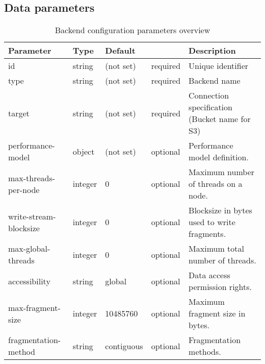 

\subsection{Data parameters}

\begin{preserve}
\begin{table}[!h]
  \begin{center}
      \begin{tabularx}{\textwidth}{llllX}
        Parameter              & Type    & Default    &          & Description \\
        \hline
        id                     & string  & (not set)  & required & Unique identifier \\
        type                   & string  & (not set)  & required & Backend name \\
        target                 & string  & (not set)  & required & Connection specification (Bucket name for S3) \\
        performance-model      & object  & (not set)  & optional & Performance model definition.\\
        max-threads-per-node   & integer & 0          & optional & Maximum number of threads on a node. \\
        write-stream-blocksize & integer & 0          & optional & Blocksize in bytes used to write fragments. \\
        max-global-threads     & integer & 0          & optional & Maximum total number of threads. \\
        accessibility          & string  & global     & optional & Data access permission rights. \\
        max-fragment-size      & integer & 10485760   & optional & Maximum fragment size in bytes. \\
        fragmentation-method   & string  & contiguous & optional & Fragmentation methods.\\
      \end{tabularx}
  \end{center}
  \caption{Backend configuration parameters overview}%
  \label{tab:backend_conf_params}
\end{table}
\end{preserve}

\begin{preserve}
\def\gapsize{1cm}
\end{preserve}
\def\gapsize{1cm}


